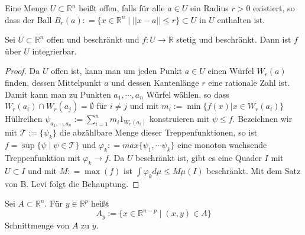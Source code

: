 \begin{Definition}
Eine Menge $U \subset \mathbb{R}^n$ heißt offen, falls für alle $a \in U$ ein Radius $r >0$ existiert, so dass der Ball $B_r(a) : = \{ x \in \mathbb{R}^n \; | \; ||x -a|| \leq r \} \subset U$ in $U$ enthalten ist.
\end{Definition}

\begin{Satz}
\label{fintu}
Sei $U \subset \mathbb{R}^n$ offen und beschränkt und $f : U \to \mathbb{R}$ stetig und beschränkt. Dann ist $f$ über $U$ integrierbar.
\end{Satz}

\begin{proof}
Da $U$ offen ist, kann  man um jeden Punkt $a \in U$ einen Würfel $W_r(a)$ finden, dessen Mittelpunkt $a$  und dessen Kantenlänge $r$ eine rationale Zahl ist. Damit kann man zu Punkten $a_1, \cdots,  a_n$ Würfel wählen, so dass $W_r(a_i) \cap W_r(a_j) = \emptyset$ für $i \neq j$ und mit $m_i := \min \{ f(x)  | x \in W_r(a_i) \} $ Hüllreihen   $\psi_{a_1, \cdots, a_n} := \sum_{i=1}^n m_i 1_{W_r(a_i)} $  konstruieren mit  $\psi \leq f$. Bezeichnen  wir mit $\mathcal{T} :=  \{ \psi_k  \}$ die abzählbare Menge dieser Treppenfunktionen, so ist $f = \sup \{ \psi \; | \; \psi \in \mathcal{T}  \}$ und $\varphi_k : = max \{ \psi_1, \cdots \psi_k  \}$ eine monoton wachsende Treppenfunktion mit $\varphi_k \to f$. Da $U$ beschränkt ist, gibt es eine Quader $I$ mit $U \subset I$ und mit $M : = \max (f)$  ist $\int \varphi_k d \mu \leq M \mu(I)$ beschränkt. Mit dem Satz von B. Levi folgt die Behauptung. 
\end{proof}


\begin{Satz}[Schnittmenge]
Sei $ A \subset \mathbb{R}^n$. Für $ y \in \mathbb{R}^p$ heißt
$$ A_y :=  \biggl \{    x \in \mathbb{R}^{n-p}  \; | \;  (x,y) \in A \biggr \}$$  
Schnittmenge von $A$ zu $y$.
\end{Satz}



